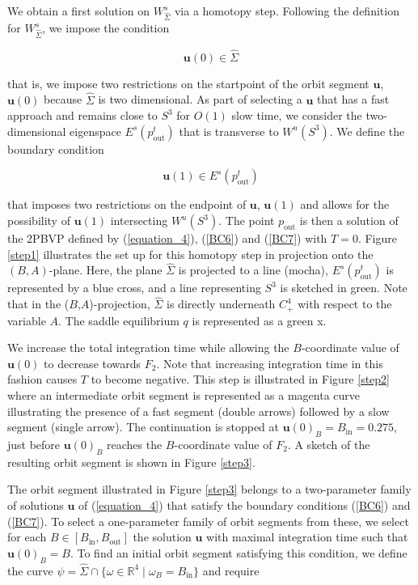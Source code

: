 \documentclass{ws-ijbc}
\begin{document}
We obtain a first solution on $W^s_{\widehat{\Sigma}}$ via a homotopy step.  Following the definition for $W^s_{\widehat{\Sigma}}$, we impose the condition
    
\begin{equation}
\mathbf{u}(0) \in \widehat{\Sigma}
\label{BC6}
\end{equation}
    
 \noindent
that is, we impose two restrictions on the startpoint of the orbit segment $\mathbf{u}$, $\mathbf{u}(0)$ because $\widehat{\Sigma}$ is two dimensional.  As part of selecting a $\mathbf{u}$ that has a fast approach and remains close to $S^3$ for $O(1)$ slow time, we consider the two-dimensional eigenspace $E^s(p^t_{\text{out}})$ that is transverse to $W^u(S^3)$.  We define the boundary condition
 
\begin{equation}
\mathbf{u}(1) \in E^s(p^t_{\text{out}})
\label{BC7}
\end{equation}
    
\noindent
that imposes two restrictions on the endpoint of $\mathbf{u}$, $\mathbf{u}(1)$ and allows for the possibility of $\mathbf{u}(1)$ intersecting $W^u(S^3)$.  The point $p_{\text{out}}$ is then a solution of the 2PBVP defined by (\ref{equation_4}), (\ref{BC6}) and (\ref{BC7}) with $T=0$.  Figure \ref{step1} illustrates the set up for this homotopy step in projection onto the $(B,A)$-plane.  Here, the plane $\widehat{\Sigma}$ is projected to a line (mocha), $E^s(p^t_{\mathrm{out}})$ is represented by a blue cross, and a line representing $S^3$ is sketched in green.  Note that in the ($B$,$A$)-projection, $\widehat{\Sigma}$ is directly underneath $C^4_+$ with respect to the variable $A$.  The saddle equilibrium $q$ is represented as a green x.
    
We increase the total integration time while allowing the $B$-coordinate value of $\mathbf{u}(0)$ to decrease towards $F_2$.  Note that increasing integration time in this fashion causes $T$ to become negative.  This step is illustrated in Figure \ref{step2} where an intermediate orbit segment is represented as a magenta curve illustrating the presence of a fast segment (double arrows) followed by a slow segment (single arrow).  The continuation is stopped at $\mathbf{u}(0)_B = B_{\text{in}}=0.275$, just before $\mathbf{u}(0)_B$ reaches the $B$-coordinate value of $F_2$.  A sketch of the resulting orbit segment is shown in Figure \ref{step3}.
    
The orbit segment illustrated in Figure \ref{step3} belongs to a two-parameter family of solutions $\mathbf{u}$ of (\ref{equation_4}) that satisfy the boundary conditions (\ref{BC6}) and (\ref{BC7}).  To select a one-parameter family of orbit segments from these, we select for each $B \in [B_{\text{in}}, B_{\text{out}}]$ the solution $\mathbf{u}$ with maximal integration time such that $\mathbf{u}(0)_B=B$.  To find an initial orbit segment satisfying this condition, we define the curve $\psi = \widehat{\Sigma}\cap \{ \omega \in \mathbb{R}^4 \; | \; \omega_B = B_{\text{in}}\}$ and require
    
\end{document}
